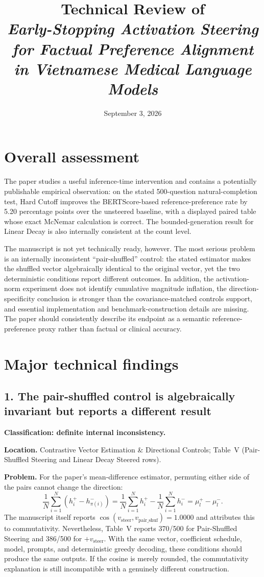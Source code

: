 \documentclass[11pt]{article}
\title{Technical Review of\\
\emph{Early-Stopping Activation Steering for Factual Preference Alignment in Vietnamese Medical Language Models}}
\author{}
\date{September 3, 2026}
\begin{document}
\maketitle

\section*{Overall assessment}

The paper studies a useful inference-time intervention and contains a potentially publishable empirical observation: on the stated 500-question natural-completion test, Hard Cutoff improves the BERTScore-based reference-preference rate by 5.20 percentage points over the unsteered baseline, with a displayed paired table whose exact McNemar calculation is correct.  The bounded-generation result for Linear Decay is also internally consistent at the count level.

The manuscript is not yet technically ready, however.  The most serious problem is an internally inconsistent ``pair-shuffled'' control: the stated estimator makes the shuffled vector algebraically identical to the original vector, yet the two deterministic conditions report different outcomes.  In addition, the activation-norm experiment does not identify cumulative magnitude inflation, the direction-specificity conclusion is stronger than the covariance-matched controls support, and essential implementation and benchmark-construction details are missing.  The paper should consistently describe its endpoint as a semantic reference-preference proxy rather than factual or clinical accuracy.

\section*{Major technical findings}

\subsection*{1. The pair-shuffled control is algebraically invariant but reports a different result}

\textbf{Classification: definite internal inconsistency.}

\textbf{Location.} Contrastive Vector Estimation \& Directional Controls; Table~V (Pair-Shuffled Steering and Linear Decay Steered rows).

\textbf{Problem.} For the paper's mean-difference estimator, permuting either side of the pairs cannot change the direction:
\[
 \frac{1}{N}\sum_{i=1}^{N}\left(h_i^+-h_{\pi(i)}^-\right)
 = \frac{1}{N}\sum_{i=1}^{N}h_i^+
 - \frac{1}{N}\sum_{i=1}^{N}h_i^-
 = \mu_l^+-\mu_l^-.
\]
The manuscript itself reports $\cos(v_{\text{steer}},v_{\text{pair\_shuf}})=1.0000$ and attributes this to commutativity.  Nevertheless, Table~V reports 370/500 for Pair-Shuffled Steering and 386/500 for $+v_{\text{steer}}$.  With the same vector, coefficient schedule, model, prompts, and deterministic greedy decoding, these conditions should produce the same outputs.  If the cosine is merely rounded, the commutativity explanation is still incompatible with a genuinely different construction.
\end{document}
